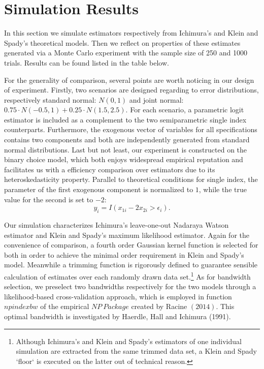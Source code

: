 \documentclass[a4paper]{article}
\begin{document}
\section{Simulation Results}

In this section we simulate estimators respectively from Ichimura's and Klein and Spady's theoretical models. Then we reflect on properties of these estimates generated via a Monte Carlo experiment with the sample size of 250 and 1000 trials. Results can be found listed in the table below.

For the generality of comparison, several points are worth noticing in our design of experiment. Firstly, two scenarios are designed regarding to error distributions, respectively standard normal: $N(0,1)$ and joint normal: $0.75 \cdot N(-0.5,1)+0.25\cdot N(1.5,2.5)$. For each scenario, a parametric logit estimator is included as a complement to the two semiparametric single index counterparts. Furthermore, the exogenous vector of variables for all specifications contains two components and both are independently generated from standard normal distributions. Last but not least, our experiment is constructed on the binary choice model, which both enjoys widespread empirical reputation and facilitates us with a efficiency comparison over estimators due to its heteroskedasticity property. Parallel to theoretical conditions for single index, the parameter of the first exogenous component is normalized to $1$, while the true value for the second is set to $-2$:
\begin{equation*}
y_i = I(x_{1i} - 2x_{2i} > \epsilon_i).
\end{equation*}

Our simulation characterizes Ichimura's leave-one-out Nadaraya Watson estimator and Klein and Spady's maximum likelihood estimator. Again for the convenience of comparison, a fourth order Gaussian kernel function is selected for both in order to achieve the minimal order requirement in Klein and Spady's model. Meanwhile a trimming function is rigorously defined to guarantee sensible calculation of estimates over each randomly drawn data set.\footnote{Although Ichimura's and Klein and Spady's estimators of one individual simulation are extracted from the same trimmed data set, a Klein and Spady `floor` is executed on the latter out of technical reason.} As for bandwidth selection, we preselect two bandwidths respectively for the two models through a likelihood-based cross-validation approach, which is employed in function $npindexbw$ of the empirical $NP\ Package$ created by Racine $(2014)$. This optimal bandwidth is investigated by Haerdle, Hall and Ichimura (1991).
\end{document}
